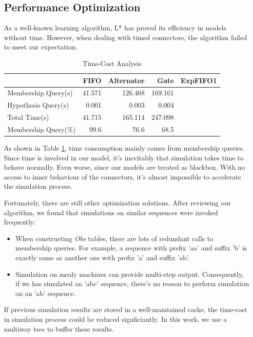 \documentclass[conference, a4paper]{IEEEtran}
\begin{document}
\subsection{Performance Optimization}
As a well-known learning algorithm, L* has proved its efficiency in models without time.
However, when dealing with timed connectors, the algorithm failed to meet our expectation.

\begin{table}[ht]
  \renewcommand{\arraystretch}{1.3}
  \caption{Time-Cost Analysis}
  \label{tabel:timecost}
  \centering
  \begin{tabular}{l||rrrr}
    \hline
    & FIFO & Alternator & Gate & ExpFIFO1\\
    \hline\hline
    Membership Query(s) & 41.571 & 126.468 & 169.161 &\\
    Hypothesis Query(s) & 0.001 & 0.003 & 0.004 &\\
    Total Time(s) & 41.715 & 165.114 & 247.098 &\\
    Membership Query(\%) & 99.6 & 76.6 & 68.5 &\\
    \hline
  \end{tabular}
\end{table}

As shown in Table \ref{tabel:timecost}, time consumption mainly comes from membership queries.
Since time is involved in our model, it's inevitably that simulation takes time to behave normally.
Even worse, since our models are treated as blackbox. With no access to inner behaviour of the
connectors, it's almost impossible to accelerate the simulation process.

Fortunately, there are still other optimization solutions. After reviewing our algorithm, we found
that simulations on similar sequences were invoked frequently:

\begin{itemize}
  \item When constructing \emph{Obs} tables, there are lots of redundant calls to membership
    queries. For example, a sequence with prefix 'aa' and suffix 'b' is exactly same as another one
    with prefix 'a' and suffix 'ab'.
  \item Simulation on mealy machines can provide multi-step output. Consequently, if we has
    simulated an 'abc' sequence, there's no reason to perform simulation on an 'ab' sequence.
\end{itemize}

If previous simulation results are stored in a well-maintained cache, the time-cost in
simulation process could be reduced signficiantly. In this work, we use a multiway tree to buffer
these results.
\end{document}
